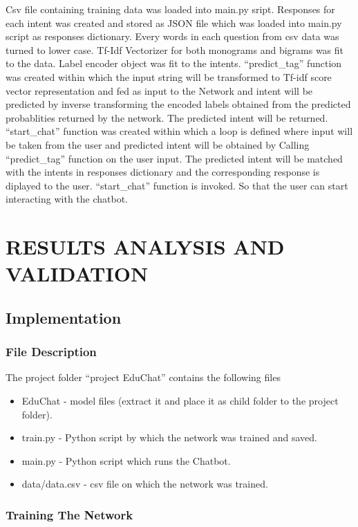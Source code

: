 \documentclass[14pt]{extarticle}
\begin{document}
Csv file containing training data was loaded into main.py sript. Responses for each intent was created and stored as JSON file which was loaded into main.py script as responses dictionary. Every words in each question from csv data was turned to lower case. Tf-Idf Vectorizer for both monograms and bigrams was fit to the data. Label encoder object was fit to the intents. “predict\_tag” function was created within which the input string will be transformed to Tf-idf score vector representation and fed as input to the Network and intent will be predicted by inverse transforming the encoded labels obtained from the predicted probablities returned by the network. The predicted intent will be returned. “start\_chat” function was created within which a loop is defined where input will be taken from the user and predicted intent will be obtained by Calling “predict\_tag” function on the user input. The predicted intent will be matched with the intents in responses dictionary and the corresponding response is diplayed to the user. “start\_chat” function is invoked. So that the user can start interacting with the chatbot.

\newpage
\section{RESULTS ANALYSIS AND VALIDATION}

\subsection{Implementation}

\subsubsection{File Description}

The project folder “project EduChat” contains the following files
\begin{itemize}
    \item EduChat - model files (extract it and place it as child folder to the project folder).
    \item train.py - Python script by which the network was trained and saved.
    \item main.py - Python script which runs the Chatbot.
    \item data/data.csv - csv file on which the network was trained.
\end{itemize}

\subsubsection{Training The Network}
\end{document}
